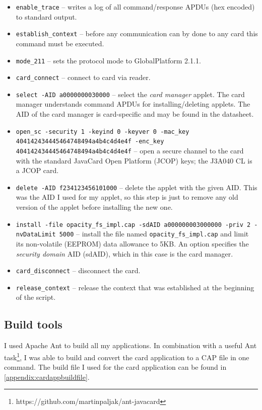 \documentclass[12pt,a4paper,twoside,openright]{report}
\begin{document}
\begin{itemize}
\item \texttt{enable\_trace} -- writes a log of all command/response APDUs (hex encoded) to standard output.
\item \texttt{establish\_context} -- before any communication can by done to any card this command must be executed.
\item \texttt{mode\_211} -- sets the protocol mode to GlobalPlatform 2.1.1.
\item \texttt{card\_connect} -- connect to card via reader.
\item \texttt{select -AID a0000000030000} -- select the \emph{card manager} applet. The card manager understands command APDUs for installing/deleting applets. The AID of the card manager is card-specific and may be found in the datasheet.
\item \texttt{open\_sc -security 1 -keyind 0 -keyver 0 -mac\_key 404142434445464748494a4b4c4d4e4f -enc\_key 404142434445464748494a4b4c4d4e4f} -- open a secure channel to the card with the standard JavaCard Open Platform (JCOP) keys; the J3A040 CL is a JCOP card.
\item \texttt{delete -AID f234123456101000} -- delete the applet with the given AID. This was the AID I used for my applet, so this step is just to remove any old version of the applet before installing the new one.
\item \texttt{install -file opacity\_fs\_impl.cap -sdAID a000000003000000 -priv 2 -nvDataLimit 5000} -- install the file named \texttt{opacity\_fs\_impl.cap} and limit its non-volatile (EEPROM) data allowance to 5KB. An option specifies the \emph{security domain} AID (sdAID), which in this case is the card manager.
\item \texttt{card\_disconnect} -- disconnect the card.
\item \texttt{release\_context} -- release the context that was established at the beginning of the script.
\end{itemize}

\subsection{Build tools}

I used Apache Ant \cite{ant} to build all my applications. In combination with a useful Ant task\footnote{https://github.com/martinpaljak/ant-javacard}, I was able to build and convert the card application to a CAP file in one command. The build file I used for the card application can be found in \autoref{appendix:cardappbuildfile}.
\end{document}
